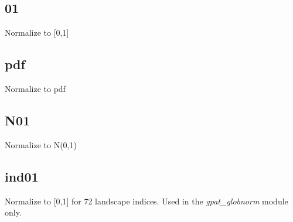 \subsection{01}

Normalize to [0,1]

\subsection{pdf}

Normalize to pdf 

\subsection{N01}

Normalize to N(0,1)

\subsection{ind01}

Normalize to [0,1] for 72 landscape indices.
Used in the {\it gpat\_globnorm} module only.
